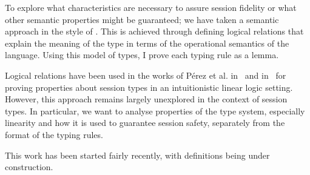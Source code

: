 To explore what characteristics are necessary to assure session fidelity or what other semantic properties might be guaranteed; we have taken a semantic approach in the style of \cite{Ahmed:2004:STM:1037736}. This is achieved through defining logical relations that explain the meaning of the type in terms of the operational semantics of the language. Using this model of types, I prove each typing rule as a lemma.

Logical relations have been used in the works of P{\'e}rez et al. in~\cite{  10.1007/978-3-642-28869-2_27} and in~\cite{PEREZ2014254} for proving properties about session types in an intuitionistic linear logic setting. However, this approach remains largely unexplored in the context of session types.
In particular, we want to analyse properties of the type system, especially linearity and how it is used to guarantee session safety, separately from the format of the typing rules.

This work has been started fairly recently, with definitions being under construction.




